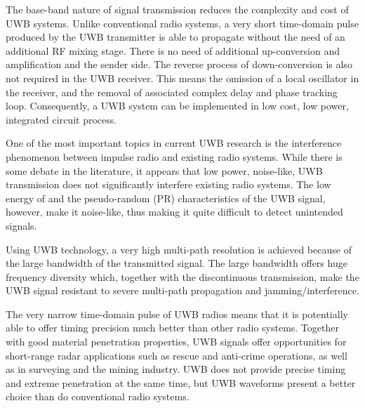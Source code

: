 \documentclass[\main/main.tex]{subfiles}
\begin{document}
The base-band nature of signal transmission reduces the complexity and cost of UWB systems.
Unlike conventional radio systems, a very short time-domain pulse produced by the UWB transmitter is able to propagate without the need of an additional RF mixing stage. 
There is no need of additional up-conversion and amplification and the sender side.
The reverse process of down-conversion is also not required in the UWB receiver. This means the omission of a local oscillator in the receiver, and the removal of associated complex delay and phase tracking loop. Consequently, a UWB system can be implemented in low cost, low power, integrated circuit process.

One of the most important topics in current UWB research is the interference phenomenon between impulse radio and existing radio systems. While there is some debate in the literature, it appears that low power, noise-like, UWB transmission does not significantly interfere existing radio systems. The low energy of and the pseudo-random (PR) characteristics of the UWB signal, however, make it noise-like, thus making it quite difficult to detect unintended signals. 


Using UWB technology, a very high multi-path resolution is achieved because of the large bandwidth of the transmitted signal. The large bandwidth offers huge frequency diversity which, together with the discontinuous transmission, make the UWB signal resistant to severe multi-path propagation and jamming/interference. 

The very narrow time-domain pulse of UWB radios means that it is potentially able to offer timing precision much better than other radio systems. Together with good material penetration properties, UWB signals offer opportunities for short-range radar applications such as rescue and anti-crime operations, as well as in surveying and the mining industry. UWB does not provide precise timing and extreme penetration at the same time, but UWB waveforms present a better choice than do conventional radio systems.
\end{document}
